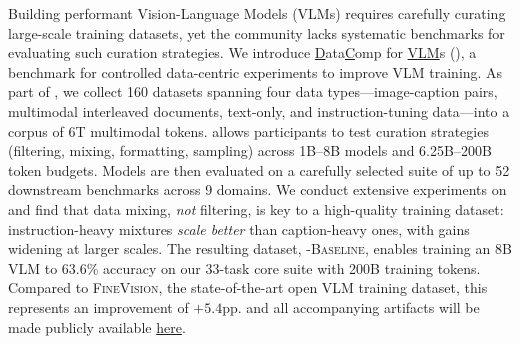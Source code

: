 Building performant Vision-Language Models (VLMs) requires carefully curating large-scale training datasets, yet the community lacks systematic benchmarks for evaluating such curation strategies.
We introduce \underline{D}ata\underline{C}omp for \underline{VLM}s (\dcvlm), a benchmark for controlled data-centric experiments to improve VLM training. 
As part of \dcvlm, we collect 160 datasets spanning four data types---image-caption pairs, multimodal interleaved documents, text-only, and instruction-tuning data---into a corpus of 6T multimodal tokens.
\dcvlm allows participants to test curation strategies (filtering, mixing, formatting, sampling) across 1B--8B models and 6.25B--200B token budgets. Models are then evaluated on a carefully selected suite of up to 52 downstream benchmarks across 9 domains.
We conduct extensive experiments on \dcvlm and find that data mixing, \emph{not} filtering, is key to a high-quality training dataset: instruction-heavy mixtures \emph{scale better} than caption-heavy ones, with gains widening at larger scales. 
The resulting dataset, \textsc{\dcvlm-Baseline}, enables training an 8B VLM to $63.6\%$ accuracy on our 33-task core suite with 200B training tokens. 
Compared to \textsc{FineVision}, the state-of-the-art open VLM training dataset, this represents an improvement of %
$+5.4$pp.
\dcvlm and all accompanying artifacts will be made publicly available \href{https://github.com/mlfoundations/dcvlm}{here}.%


